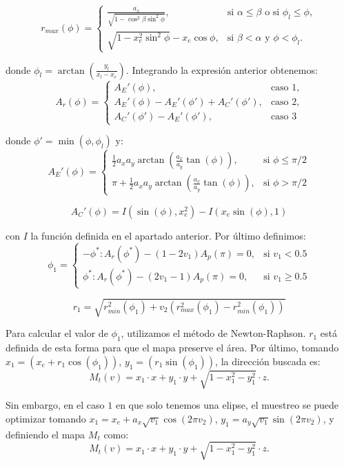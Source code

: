 \[ r_{max}(\phi) =
   \begin{cases}
      \frac{a_x}{\sqrt{1-\cos^2\beta\sin^2\phi}}, & \text{si }\alpha\leq\beta \text{ o si } \phi_l\leq\phi,\\
      \sqrt{1-x_e^2\sin^2\phi}-x_e\cos\phi, & \text{si } \beta< \alpha \text{ y } \phi < \phi_l.
   \end{cases}
  \]

donde $\phi_l=\arctan(\frac{y_l}{x_l-x_e})$. Integrando la expresión anterior obtenemos:
\[ A_r(\phi) =
   \begin{cases}
      A_E'(\phi), & \text{caso 1}, \\
      A_E'(\phi) - A_E'(\phi') + A_C'(\phi')  , & \text{caso 2}, \\
      A_C'(\phi') - A_E'(\phi'), & \text{caso 3} 
   \end{cases}
  \]

donde $\phi' = \min(\phi, \phi_l)$ y:
\[ A_E'(\phi) =
   \begin{cases}
        \frac{1}{2}a_xa_y\arctan(\frac{a_x}{a_y}\tan(\phi)), & \text{si $\phi\leq \pi/2$}\\
        \pi + \frac{1}{2}a_xa_y\arctan(\frac{a_x}{a_y}\tan(\phi)), & \text{si $\phi > \pi/2$}
   \end{cases}
   \]
   
$$A_C'(\phi) = I(\sin(\phi),x_e^2)-I(x_e\sin(\phi),1)$$

con $I$ la función definida en el apartado anterior. Por último definimos:
\[ \phi_1 = 
   \begin{cases} 
      -\phi^*: A_r(\phi^*)-(1-2v_1)A_p(\pi)=0,  & \text{si $v_1<0.5$} \\
      \phi^*:  A_r(\phi^*)-(2v_1-1)A_p(\pi)=0,  & \text{si $v_1\geq 0.5$}
   \end{cases}
\]

$$r_1 = \sqrt{r_{min}^2(\phi_1) + v_2 (r_{max}^2(\phi_1) - r_{min}^2(\phi_1))}$$

Para calcular el valor de $\phi_1$, utilizamos el método de Newton-Raphson. $r_1$ está definida de esta forma para que el mapa preserve el área. Por último, tomando $x_1 = (x_e + r_1\cos(\phi_1))$, $y_1 = (r_1\sin(\phi_1))$, la dirección buscada es:
$$M_t(v) = x_1\cdot x + y_1\cdot y + \sqrt{1-x_1^2-y_1^2} \cdot z.$$


Sin embargo, en el caso $1$ en que solo tenemos una elipse, el muestreo se puede optimizar tomando $x_1=x_e + a_x\sqrt{v_1}\cos(2\pi v_2)$, $y_1= a_y\sqrt{v_1}\sin(2\pi v_2)$, y definiendo el mapa $M_t$ como:
$$M_t(v) = x_1\cdot x + y_1\cdot y + \sqrt{1-x_1^2-y_1^2} \cdot z.$$


